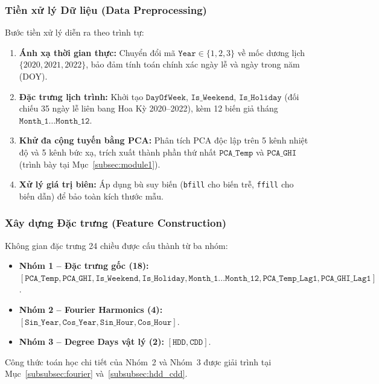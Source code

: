 \subsubsection{Tiền xử lý Dữ liệu (Data Preprocessing)}
Bước tiền xử lý diễn ra theo trình tự:
\begin{enumerate}
    \item \textbf{Ánh xạ thời gian thực:} Chuyển đổi mã $\texttt{Year} \in \{1, 2, 3\}$ về mốc dương lịch $\{2020, 2021, 2022\}$, bảo đảm tính toán chính xác ngày lễ và ngày trong năm (DOY).
    \item \textbf{Đặc trưng lịch trình:} Khởi tạo $\texttt{DayOfWeek}$, $\texttt{Is\_Weekend}$, $\texttt{Is\_Holiday}$ (đối chiếu 35 ngày lễ liên bang Hoa Kỳ 2020--2022), kèm 12 biến giả tháng $\texttt{Month\_1}\ldots\texttt{Month\_12}$.
    \item \textbf{Khử đa cộng tuyến bằng PCA:} Phân tích PCA độc lập trên 5 kênh nhiệt độ và 5 kênh bức xạ, trích xuất thành phần thứ nhất $\texttt{PCA\_Temp}$ và $\texttt{PCA\_GHI}$ (trình bày tại Mục~\ref{subsec:module1}).
    \item \textbf{Xử lý giá trị biên:} Áp dụng bù suy biến (\texttt{bfill} cho biến trễ, \texttt{ffill} cho biến dẫn) để bảo toàn kích thước mẫu.
\end{enumerate}

\subsubsection{Xây dựng Đặc trưng (Feature Construction)}
\label{subsubsec:feature_construction}
Không gian đặc trưng 24 chiều được cấu thành từ ba nhóm:
\begin{itemize}
    \item \textbf{Nhóm 1 -- Đặc trưng gốc (18):} $[\texttt{PCA\_Temp}, \texttt{PCA\_GHI}, \texttt{Is\_Weekend}, \texttt{Is\_Holiday}, \texttt{Month\_1}\ldots\texttt{Month\_12}, \texttt{PCA\_Temp\_Lag1}, \texttt{PCA\_GHI\_Lag1}]$.
    \item \textbf{Nhóm 2 -- Fourier Harmonics (4):} $[\texttt{Sin\_Year}, \texttt{Cos\_Year}, \texttt{Sin\_Hour}, \texttt{Cos\_Hour}]$.
    \item \textbf{Nhóm 3 -- Degree Days vật lý (2):} $[\texttt{HDD}, \texttt{CDD}]$.
\end{itemize}
Công thức toán học chi tiết của Nhóm~2 và Nhóm~3 được giải trình tại Mục~\ref{subsubsec:fourier} và~\ref{subsubsec:hdd_cdd}.

